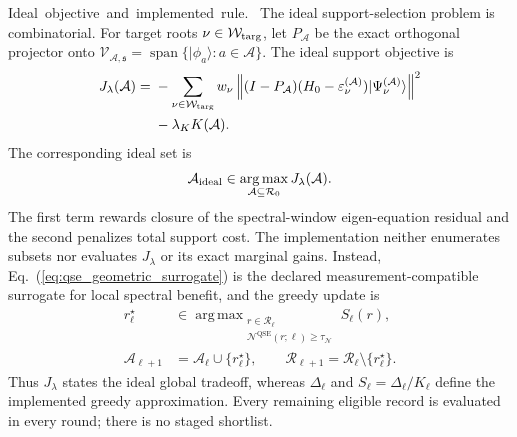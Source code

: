 \documentclass[
  reprint,
  amsmath,
  amssymb,
  aps,
  pra,
  nofootinbib,
  superscriptaddress,
  floatfix
]{revtex4-2}
\newcommand{\tentative}[1]{\textcolor{red!70!black}{#1}}
\newcommand{\structlabel}[1]{\noindent\mbox{\tentative{#1.}}~}
\newcommand{\Acal}{\mathcal{A}}
\newcommand{\Ncal}{\mathcal{N}}
\newcommand{\Vcal}{\mathcal{V}}
\newcommand{\Wcal}{\mathcal{W}}
\newcommand{\qse}{\mathrm{QSE}}
\newcommand{\argmaxp}{\mathop{\mathrm{arg\,max}}}
\newcommand{\spanop}{\operatorname{span}}
\newcommand{\ket}[1]{|#1\rangle}
\begin{document}
\structlabel{Ideal objective and implemented rule}
The ideal support-selection problem is combinatorial.  For target roots
$\nu\in\Wcal_{\rm targ}$, let $P_\Acal$ be the exact orthogonal projector
onto $\Vcal_{\Acal,\mathfrak s}=\spanop\{\ket{\phi_a}:a\in\Acal\}$.  The
ideal support objective is
\begin{equation}
\begin{aligned}
J_\lambda(\Acal)
={}&-
\sum_{\nu\in\Wcal_{\rm targ}}
w_\nu
\left\|
(I-P_{\Acal})(H_0-\varepsilon_\nu^{(\Acal)})
\ket{\Psi_\nu^{(\Acal)}}
\right\|^2
\\
&-\lambda_K K(\Acal).
\end{aligned}
\label{eq:qse_ideal_objective}
\end{equation}
The corresponding ideal set is
\begin{equation}
\Acal_{\rm ideal}
\in
\argmaxp_{\Acal\subseteq\mathcal R_0}J_\lambda(\Acal).
\label{eq:qse_ideal_set_problem}
\end{equation}
The first term rewards closure of the spectral-window eigen-equation residual
and the second penalizes total support cost.  The implementation neither
enumerates subsets nor evaluates $J_\lambda$ or its exact marginal gains.
Instead, Eq.~(\ref{eq:qse_geometric_surrogate}) is the declared
measurement-compatible surrogate for local spectral benefit, and the greedy
update is
\begin{equation}
\begin{aligned}
r_\ell^\star
&\in
\argmaxp_{\substack{r\in\mathcal R_\ell\\
\Ncal^{\qse}(r;\ell)\ge\tau_{\Ncal}}}
S_\ell(r),
\\
\Acal_{\ell+1}&=\Acal_\ell\cup\{r_\ell^\star\},
\qquad
\mathcal R_{\ell+1}=\mathcal R_\ell\setminus\{r_\ell^\star\}.
\end{aligned}
\label{eq:qse_greedy_update}
\end{equation}
Thus $J_\lambda$ states the ideal global tradeoff, whereas $\Delta_\ell$ and
$S_\ell=\Delta_\ell/K_\ell$ define the implemented greedy approximation.
Every remaining eligible record is evaluated in every round; there is no
staged shortlist.
\end{document}
